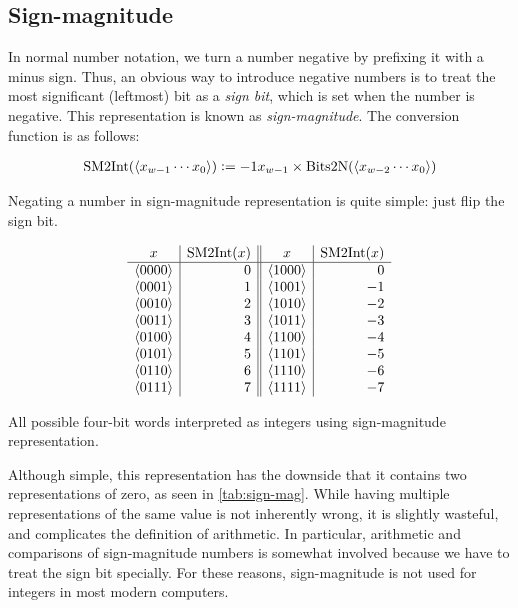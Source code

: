 \subsection{Sign-magnitude}
\label{sec:sign-magnitude}

In normal number notation, we turn a number negative by prefixing it
with a minus sign.  Thus, an obvious way to introduce negative numbers
is to treat the most significant (leftmost) bit as a \emph{sign bit},
which is set when the number is negative.  This representation is
known as \emph{sign-magnitude}.  The conversion function is as
follows:

\begin{definition}
\begin{align*}
  \mathrm{SM2Int}(\langle x_{w-1}\cdots x_{0} \rangle) \vcentcolon= -1x_{w-1} \times \mathrm{Bits2N}(\langle x_{w-2}\cdots x_{0} \rangle)
\end{align*}
\label{def:sm2int}
\end{definition}

Negating a number in sign-magnitude representation is quite simple:
just flip the sign bit.

\begin{table}
  \centering
  \[
  \begin{array}{c|r||c|r}
    x & \mathrm{SM2Int}(x) & x & \mathrm{SM2Int}(x) \\\hline
    \langle 0000 \rangle & 0 & \langle 1000 \rangle & 0 \\
    \langle 0001 \rangle & 1 & \langle 1001 \rangle & -1 \\
    \langle 0010 \rangle & 2 & \langle 1010 \rangle & -2 \\
    \langle 0011 \rangle & 3 & \langle 1011 \rangle & -3 \\
    \langle 0100 \rangle & 4 & \langle 1100 \rangle & -4 \\
    \langle 0101 \rangle & 5 & \langle 1101 \rangle & -5 \\
    \langle 0110 \rangle & 6 & \langle 1110 \rangle & -6 \\
    \langle 0111 \rangle & 7 & \langle 1111 \rangle & -7 \\
  \end{array}
  \]
  \caption{All possible four-bit words interpreted as integers using
    sign-magnitude representation.}
  \label{tab:sign-mag}
\end{table}

Although simple, this representation has the downside that it contains
two representations of zero, as seen in \cref{tab:sign-mag}.  While
having multiple representations of the same value is not inherently
wrong, it is slightly wasteful, and complicates the definition of
arithmetic.  In particular, arithmetic and comparisons of
sign-magnitude numbers is somewhat involved because we have to treat
the sign bit specially.  For these reasons, sign-magnitude is not used
for integers in most modern computers.

